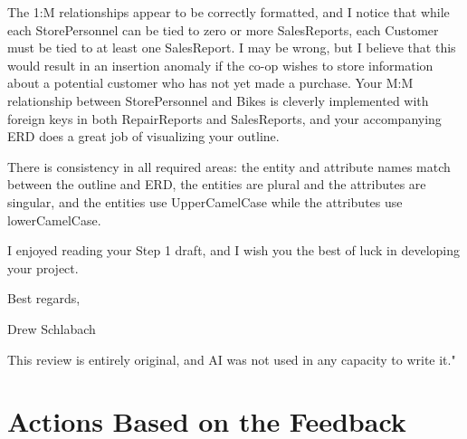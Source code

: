 \documentclass{article}
\begin{document}
\begin{tcolorbox}[colback=secondarycolor, colframe=primarycolor, title=\textbf{Step 1: Peer Review 3 - Drew Schlabach}]
\vspace{0.2cm}

The 1:M relationships appear to be correctly formatted, and I notice that while each StorePersonnel can be tied to zero or more SalesReports, each Customer must be tied to at least one SalesReport. I may be wrong, but I believe that this would result in an insertion anomaly if the co-op wishes to store information about a potential customer who has not yet made a purchase. Your M:M relationship between StorePersonnel and Bikes is cleverly implemented with foreign keys in both RepairReports and SalesReports, and your accompanying ERD does a great job of visualizing your outline. 

\vspace{0.2cm}

There is consistency in all required areas: the entity and attribute names match between the outline and ERD, the entities are plural and the attributes are singular, and the entities use UpperCamelCase while the attributes use lowerCamelCase. 

\vspace{0.2cm}

I enjoyed reading your Step 1 draft, and I wish you the best of luck in developing your project.

\vspace{0.2cm}

Best regards,

\vspace{0.2cm}

Drew Schlabach

\vspace{0.2cm}

This review is entirely original, and AI was not used in any capacity to write it."
\vspace{0.2cm}
\end{tcolorbox}

\section{Actions Based on the Feedback}
\end{document}
